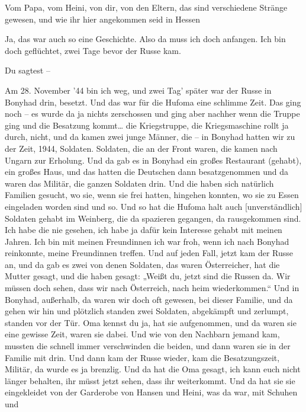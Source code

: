 \documentclass[ngerman,]{article}
\providecommand{\tightlist}{%
  \setlength{\itemsep}{0pt}\setlength{\parskip}{0pt}}
\begin{document}
\begin{multicols}{2}
\begin{description}
\tightlist
\item[Ruth]
Vom Papa, vom Heini, von dir, von den Eltern, das sind verschiedene
Stränge gewesen, und wie ihr hier angekommen seid in Hessen
\item[Käthe]
Ja, das war auch so eine Geschichte. Also da muss ich doch anfangen. Ich
bin doch geflüchtet, zwei Tage bevor der Russe kam.
\item[Ruth]
Du sagtest –
\item[Käthe]
Am 28. November '44 bin ich weg, und zwei Tag' später war der Russe in
Bonyhad drin, besetzt. Und das war für die Hufoma eine schlimme Zeit.
Das ging noch – es wurde da ja nichts zerschossen und ging aber nachher
wenn die Truppe ging und die Besatzung kommt\ldots{} die Kriegstruppe,
die Kriegsmaschine rollt ja durch, nicht, und da kamen zwei junge
Männer, die – in Bonyhad hatten wir zu der Zeit, 1944, Soldaten.
Soldaten, die an der Front waren, die kamen nach Ungarn zur Erholung.
Und da gab es in Bonyhad ein großes Restaurant (gehabt), ein großes
Haus, und das hatten die Deutschen dann besatzgenommen und da waren das
Militär, die ganzen Soldaten drin. Und die haben sich natürlich Familien
gesucht, wo sie, wenn sie frei hatten, hingehen konnten, wo sie zu Essen
eingeladen worden sind und so. Und so hat die Hufoma halt auch
{[}unverständlich{]} Soldaten gehabt im Weinberg, die da spazieren
gegangen, da rausgekommen sind. Ich habe die nie gesehen, ich habe ja
dafür kein Interesse gehabt mit meinen Jahren. Ich bin mit meinen
Freundinnen ich war froh, wenn ich nach Bonyhad reinkonnte, meine
Freundinnen treffen. Und auf jeden Fall, jetzt kam der Russe an, und da
gab es zwei von denen Soldaten, das waren Österreicher, hat die Mutter
gesagt, und die haben gesagt: „Weißt du, jetzt sind die Russen da. Wir
müssen doch sehen, dass wir nach Österreich, nach heim wiederkommen.“
Und in Bonyhad, außerhalb, da waren wir doch oft gewesen, bei dieser
Familie, und da gehen wir hin und plötzlich standen zwei Soldaten,
abgekämpft und zerlumpt, standen vor der Tür. Oma kennst du ja, hat sie
aufgenommen, und da waren sie eine gewisse Zeit, waren sie dabei. Und
wie von den Nachbarn jemand kam, mussten die schnell immer verschwinden
die beiden, und dann waren sie in der Familie mit drin. Und dann kam der
Russe wieder, kam die Besatzungszeit, Militär, da wurde es ja brenzlig.
Und da hat die Oma gesagt, ich kann euch nicht länger behalten, ihr
müsst jetzt sehen, dass ihr weiterkommt. Und da hat sie sie eingekleidet
von der Garderobe von Hansen und Heini, was da war, mit Schuhen und

\end{description}
\end{multicols}
\end{document}
